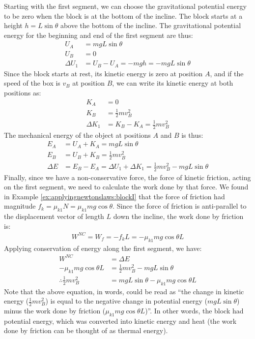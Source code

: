 \begin{example}
Starting with the first segment, we can choose the gravitational potential energy to be zero when the block is at the bottom of the incline. The block starts at a height $h=L\sin\theta$ above the  bottom of the incline. The gravitational potential energy for the beginning and end of the first segment are thus:
\begin{align*}
U_A &= mgL\sin\theta\\
U_B &= 0\\
\Delta U_1 &= U_B-U_A = -mgh = -mgL\sin\theta
\end{align*}
Since the block starts at rest, its kinetic energy is zero at position $A$, and if the speed of the box is $v_B$ at position $B$, we can write its kinetic energy at both positions as:
\begin{align*}
K_A &=0\\
K_B &= \frac{1}{2}mv_B^2\\
\Delta K_1 &=K_B-K_A= \frac{1}{2}mv_B^2
\end{align*}
The mechanical energy of the object at positions $A$ and $B$ is thus:
\begin{align*}
E_A &= U_A+K_A = mgL\sin\theta\\
E_B &= U_B+K_B = \frac{1}{2}mv_B^2\\
\Delta E &= E_B - E_A = \Delta U_1+\Delta K_1= \frac{1}{2}mv_B^2 - mgL\sin\theta
\end{align*}
Finally, since we have a non-conservative force, the force of kinetic friction, acting on the first segment, we need to calculate the work done by that force. We found in Example \ref{ex:applyingnewtonslaws:blockI} that the force of friction had magnitude $f_k=\mu_{k1}N=\mu_{k1}mg\cos\theta$. Since the force of friction is anti-parallel to the displacement vector of length $L$ down the incline, the work done by friction is:
\begin{align*}
W^{NC}=W_f = -f_kL=-\mu_{k1}mg\cos\theta L
\end{align*}
Applying conservation of energy along the first segment, we have:
\begin{align*}
W^{NC} &= \Delta E\\
-\mu_{k1}mg\cos\theta L &= \frac{1}{2}mv_B^2 - mgL\sin\theta\\
\therefore \frac{1}{2}mv_B^2 &= mgL\sin\theta-\mu_{k1}mg\cos\theta L 
\end{align*}
Note that the above equation, in words, could be read as ``the change in kinetic energy ($\frac{1}{2}mv_B^2$) is equal to the negative change in potential energy ($mgL\sin\theta$) minus the work done by friction ($\mu_{k1}mg\cos\theta L$)''. In other words, the block had potential energy, which was converted into kinetic energy and heat (the work done by friction can be thought of as thermal energy). 


\end{example}
